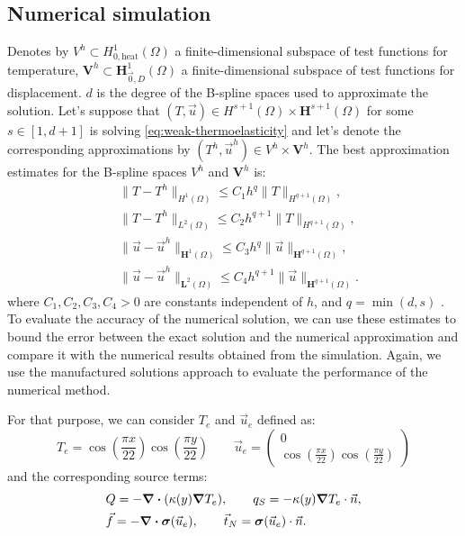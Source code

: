 \documentclass[a4paper,12pt,twoside]{report}
\begin{document}
\subsection{Numerical simulation}
Denotes by $V^h \subset H^1_{0,\text{heat}}(\Omega)$ a finite-dimensional subspace of test functions for temperature, $\boldsymbol{V}^h \subset \boldsymbol{H}^1_{\vec 0,D}(\Omega)$ a finite-dimensional subspace of test functions for displacement. $d$ is the degree of the B-spline spaces used to approximate the solution. Let's suppose that $(T,\vec u) \in H^{s+1}(\Omega) \times \boldsymbol{H}^{s+1}(\Omega)$ for some $s \in [1, d+1]$ is solving \eqref{eq:weak-thermoelasticity} and let's denote the corresponding approximations by $(T^h,\vec u^h) \in V^h \times \boldsymbol{V}^h$. The best approximation estimates for the B-spline spaces $V^h$ and $\boldsymbol{V}^h$ is: 
\begin{equation}
	\begin{aligned}
		& \|T - T^h\|_{H^1(\Omega)} \leq C_1 h^q \|T\|_{H^{q+1}(\Omega)}, \\
		& \|T - T^h\|_{L^2(\Omega)} \leq C_2 h^{q+1} \|T\|_{H^{q+1}(\Omega)}, \\
		& \|\vec u - \vec u^h\|_{\boldsymbol H^1(\Omega)} \leq C_3 h^q \|\vec u\|_{\boldsymbol H^{q+1}(\Omega)}, \\
		& \|\vec u - \vec u^h\|_{\boldsymbol L^2(\Omega)} \leq C_4 h^{q+1} \|\vec u\|_{\boldsymbol H^{q+1}(\Omega)}.
	\end{aligned}
	\label{eq:approximation-estimates}
\end{equation}
where $C_1, C_2, C_3, C_4 > 0$ are constants independent of $h$, and $q = \min(d, s)$ \cite{da_veiga_mathematical_2014}.
To evaluate the accuracy of the numerical solution, we can use these estimates to bound the error between the exact solution and the numerical approximation and compare it with the numerical results obtained from the simulation. Again, we use the manufactured solutions approach to evaluate the performance of the numerical method.

For that purpose, we can consider $T_e$ and $\vec u_e$ defined as: 
$$
T_e = \cos\left(\frac{\pi x}{22}\right) \cos\left(\frac{\pi y}{22}\right) \qquad \vec u_e = \begin{pmatrix}
	0 \\
	\cos\left(\frac{\pi x}{22}\right) \cos\left(\frac{\pi y}{22}\right) 
\end{pmatrix}
$$
and the corresponding source terms:
\begin{equation*}
	\begin{aligned}
	& Q = - \div(\kappa(y) \grad T_e), \qquad q_S = -\kappa(y) \grad T_e \cdot \vec n, \\
	& \vec f = -\div \boldsymbol{\sigma}(\vec u_e), \qquad \vec t_N = \boldsymbol{\sigma}(\vec u_e) \cdot \vec n.
\end{aligned}
\end{equation*}
\end{document}
